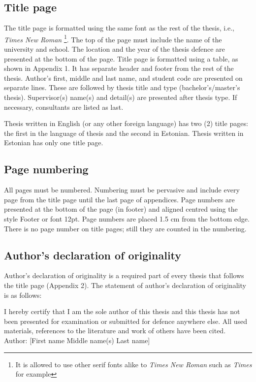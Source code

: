 \newpage
\subsection{Title page}
The title page is formatted using the same font as the rest of the thesis, i.e., \textit{Times New
Roman} \footnote{It is allowed to use other serif fonts alike to \textit{Times New Roman} such as \textit{Times} for example}. The top of the page must include the name of the university and school. The location and the year of the thesis defence are presented at the bottom of the page. Title page is formatted using a table, as shown in Appendix 1. It has separate header and footer from the rest of the thesis. Author’s first, middle and last name, and student code are presented on separate lines. These are followed by thesis title and type (bachelor’s/master’s thesis). Supervisor(s) name(s) and detail(s) are presented after thesis
type. If necessary, consultants are listed as last.

Thesis written in English (or any other foreign language) has two (2) title pages: the first
in the language of thesis and the second in Estonian. Thesis written in Estonian has only
one title page.

\subsection{Page numbering}
All pages must be numbered. Numbering must be pervasive and include every page from the title page until the last page of appendices. Page numbers are presented at the bottom
of the page (in footer) and aligned centred using the style Footer or font 12pt. Page numbers are placed 1.5 cm from the bottom edge. There is no page number on title pages;
still they are counted in the numbering.

\subsection{Author’s declaration of originality}
Author’s declaration of originality is a required part of every thesis that follows the title page (Appendix 2). The statement of author’s declaration of originality is as follows:

\begin{tcolorbox}[arc=0pt, outer arc=0pt, boxrule=0pt, left=0mm]
I hereby certify that I am the sole author of this thesis and this thesis has not been
presented for examination or submitted for defence anywhere else. All used materials,
references to the literature and work of others have been cited.\\

Author: [First name Middle name(s) Last name] \\ \relax
[dd.mm.yyyy]
\end{tcolorbox}

